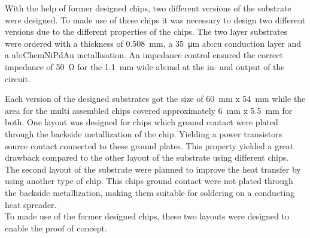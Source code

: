 With the help of former designed chips, two different versions of the substrate were designed.
To made use of these chips it was necessary to design two different versions due to the different properties of the chips.
The two layer substrates were ordered with a thickness of \SI{0.508}{\milli \metre}, a \SI{35}{\micro \metre} \gls{ab:cu} conduction layer and a \gls{ab:ChemNiPdAu} metallisation.
An impedance control ensured the correct impedance of \SI{50}{\ohm} for the \SI{1.1}{\milli \meter} wide \gls{ab:msl} at the in- and output of the circuit.


Each version of the designed substrates got the size of \SI{60}{\milli \meter} x \SI{54}{\milli \meter} while the area for the multi assembled chips covered approximately \SI{6}{\milli \meter} x \SI{5.5}{\milli \meter} for both.
One layout was designed for chips which ground contact were plated through the backside metallization of the chip.
Yielding a power transistors source contact connected to these ground plates.
This property yielded a great drawback compared to the other layout of the substrate using different chips.\\
The second layout of the substrate were planned to improve the heat transfer by using another type of chip.
This chips ground contact were not plated through the backside metallization, making them suitable for soldering on a conducting heat spreader.\\
To made use of the former designed chips, these two layouts were designed to enable the proof of concept.


